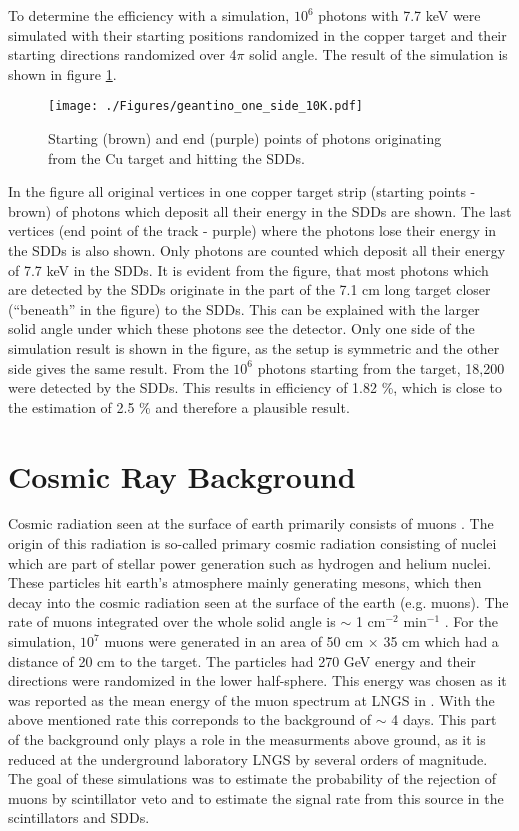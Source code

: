 To determine the efficiency with a simulation, $10^6$ photons with 7.7 keV were simulated with their starting positions randomized in the copper target and their starting directions randomized over 4$\pi$ solid angle. The result of the simulation is shown in figure \ref{fig:eff_simulation}.
\begin{figure}[h]
 \centering
 \texttt{[image: ./Figures/geantino\_one\_side\_10K.pdf]}
 \caption{Starting (brown) and end (purple) points of photons originating from the Cu target and hitting the SDDs.}
 \label{fig:eff_simulation}
\end{figure}
In the figure all original vertices in one copper target strip (starting points - brown) of photons which deposit all their energy in the SDDs are shown. The last vertices (end point of the track - purple) where the photons lose their energy in the SDDs is also shown. Only photons are counted which deposit all their energy of 7.7 keV in the SDDs. It is evident from the figure, that most photons which are detected by the SDDs originate in the part of the 7.1 cm long target closer (``beneath'' in the figure) to the SDDs. This can be explained with the larger solid angle under which these photons see the detector. Only one side of the simulation result is shown in the figure, as the setup is symmetric and the other side gives the same result. From the $10^6$ photons starting from the target, 18,200 were detected by the SDDs. This results in efficiency of 1.82 \%, which is close to the estimation of 2.5 \% and therefore a plausible result.

\section{Cosmic Ray Background}

Cosmic radiation seen at the surface of earth primarily consists of muons \cite{Gaisser2000}. The origin of this radiation is so-called primary cosmic radiation consisting of nuclei which are part of  stellar power generation such as hydrogen and helium nuclei. These particles hit earth's atmosphere mainly generating mesons, which then decay into the cosmic radiation seen at the surface of the earth (e.g. muons). The rate of muons integrated over the whole solid angle is $\sim$ 1 cm$^{-2}$ min$^{-1}$ \cite{Gaisser2000}. For the simulation, $10^{7}$ muons were generated in an area of 50 cm $\times$ 35 cm which had a distance of 20 cm to the target. The particles had 270 GeV energy and their directions were randomized in the lower half-sphere. This energy was chosen as it was reported as the mean energy of the muon spectrum at LNGS in \cite{Ambrosio2003}. With the above mentioned rate this correponds to the background of $\sim$ 4 days. This part of the background only plays a role in the measurments above ground, as it is reduced at the underground laboratory LNGS by several orders of magnitude. The goal of these simulations was to estimate the probability of the rejection of muons by scintillator veto and to estimate the signal rate from this source in the scintillators and SDDs.

